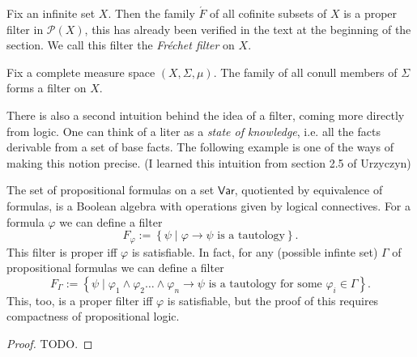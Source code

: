 \begin{example}
    Fix an infinite set \( X \). Then the family \( \acute F \) of all cofinite subsets of \( X \) is a proper filter in \( \mathcal{P}(X) \), this has already been verified in the text at the beginning of the section. We call this filter the \emph{Fréchet filter} on \( X \).
\end{example}

\begin{example}
    Fix a complete measure space \( (X, \Sigma, \mu) \). The family of all conull members of \( \Sigma \) forms a filter on \( X \).
\end{example}

There is also a second intuition behind the idea of a filter, coming more directly from logic. One can think of a liter as a \emph{state of knowledge}, i.e. all the facts derivable from a set of base facts. The following example is one of the ways of making this notion precise. (I learned this intuition from section 2.5 of Urzyczyn)

\begin{example}
    The set of propositional formulas on a set \( \mathsf{Var} \), quotiented by equivalence of formulas, is a Boolean algebra with operations given by logical connectives. For a formula \( \varphi \) we can define a filter
    \[ 
        F_\varphi := \left\{ \psi \mid \varphi \to \psi \text{ is a tautology} \right\}. 
   \]
   This filter is proper iff \( \varphi \) is satisfiable. In fact, for any (possible infinte set) \( \Gamma \) of propositional formulas we can define a filter
   \[ 
       F_\Gamma := \left\{ \psi \mid \varphi_1 \wedge \varphi_2 \ldots \wedge \varphi_n \to \psi \text{ is a tautology for some } \varphi_i \in \Gamma \right\}. 
  \]
  This, too, is a proper filter iff \( \varphi \) is satisfiable, but the proof of this requires compactness of propositional logic.
\end{example}



\begin{proof}
TODO.
\end{proof}

